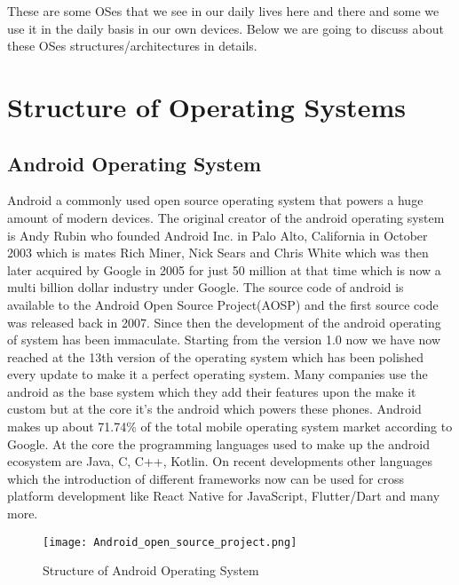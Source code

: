\documentclass[conference]{IEEEtran}
\begin{document}
These are some OSes that we see in our daily lives here and there and some we use it in the daily basis in our own devices. Below we are going to discuss about these OSes structures/architectures in details.

\section{Structure of Operating Systems}

\subsection{Android Operating System}
Android a commonly used open source operating system that powers a huge amount of modern devices. The original creator of the android operating system is Andy Rubin who founded Android Inc. in Palo Alto, California in October 2003 which is mates Rich Miner, Nick Sears and Chris White which was then later acquired by Google in 2005 for just 50 million at that time which is now a multi billion dollar industry under Google. The source code of android is available to the Android Open Source Project(AOSP) and the first source code was released back in 2007. Since then the development of the android operating of system has been immaculate. Starting from the version 1.0 now we have now reached at the 13th version of the operating system which has been polished every update to make it a perfect operating system. Many companies use the android as the base system which they add their features upon the make it custom but at the core it's the android which powers these phones. Android makes up about 71.74\% of the total mobile operating system market according to Google. At the core the programming languages used to make up the android ecosystem are Java, C, C++, Kotlin. On recent developments other languages which the introduction of different frameworks now can be used for cross platform development like React Native for JavaScript, Flutter/Dart and many more.

\begin{figure}[htbp]
\centerline{\texttt{[image: Android\_open\_source\_project.png]}}
\caption{Structure of Android Operating System}
\label{fig}
\end{figure}
\end{document}
